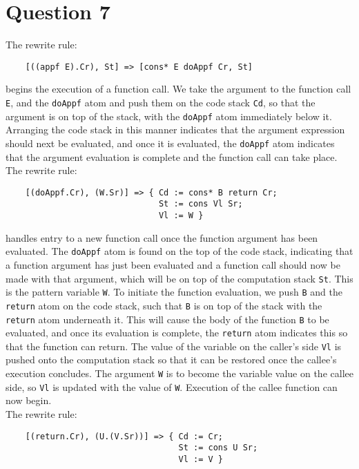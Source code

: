 \documentclass{article}
\begin{document}
\section*{Question 7}
The rewrite rule:
\begin{verbatim}
    [((appf E).Cr), St] => [cons* E doAppf Cr, St]
\end{verbatim}
begins the execution of a function call. We take the argument to the function call \texttt{E}, and the \texttt{doAppf} atom and push them on the code stack \texttt{Cd}, so that the argument is on top of the stack, with the \texttt{doAppf} atom immediately below it. Arranging the code stack in this manner indicates that the argument expression should next be evaluated, and once it is evaluated, the \texttt{doAppf} atom indicates that the argument evaluation is complete and the function call can take place.\\
\indent The rewrite rule:
\begin{verbatim}
    [(doAppf.Cr), (W.Sr)] => { Cd := cons* B return Cr;
                               St := cons Vl Sr;
                               Vl := W }
\end{verbatim}
handles entry to a new function call once the function argument has been evaluated. The \texttt{doAppf} atom is found on the top of the code stack, indicating that a function argument has just been evaluated and a function call should now be made with that argument, which will be on top of the computation stack \texttt{St}. This is the pattern variable \texttt{W}. To initiate the function evaluation, we push \texttt{B} and the \texttt{return} atom on the code stack, such that \texttt{B} is on top of the stack with the \texttt{return} atom underneath it. This will cause the body of the function \texttt{B} to be evaluated, and once its evaluation is complete, the \texttt{return} atom indicates this so that the function can return. The value of the variable on the caller's side \texttt{Vl} is pushed onto the computation stack so that it can be restored once the callee's execution concludes. The argument \texttt{W} is to become the variable value on the callee side, so \texttt{Vl} is updated with the value of \texttt{W}. Execution of the callee function can now begin.\\
\indent The rewrite rule:
\begin{verbatim}
    [(return.Cr), (U.(V.Sr))] => { Cd := Cr;
                                   St := cons U Sr;
                                   Vl := V }
\end{verbatim}
\end{document}
